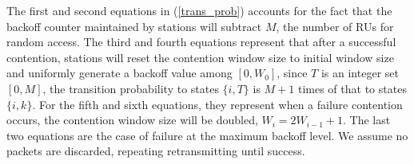 \documentclass[journal]{IEEEtran}
\begin{document}
The first and second equations in (\ref{trans_prob}) accounts for the fact that the backoff counter maintained by stations will subtract $M$, the number of RUs for random access. 
The third and fourth equations represent that after a successful contention, stations will reset the contention window size to initial window size and uniformly generate a backoff value among $[0,W_0]$, since $T$ is an integer set $[0,M]$, the transition probability to states $\lbrace i, T \rbrace$ is $M+1$ times of that to states $\lbrace i, k \rbrace$. 
For the fifth and sixth equations, they represent when a failure contention occurs, the contention window size will be doubled, $W_i=2W_{i-1}+1$.
The last two equations are the case of failure at the maximum backoff level. 
We assume no packets are discarded, repeating retransmitting until success.
\end{document}
